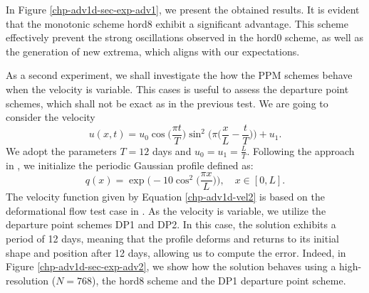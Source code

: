 In Figure \ref{chp-adv1d-sec-exp-adv1}, we present the obtained results.
It is evident that the monotonic scheme hord8 exhibit a significant advantage.
This scheme effectively prevent the strong oscillations observed in the hord0 scheme,
as well as the generation of new extrema, which aligns with our expectations.

As a second experiment, we shall investigate the how the PPM schemes behave when the velocity
is variable.
This cases is useful to assess the departure point schemes, which shall not be exact as in the previous test.
We are going to consider the velocity
\begin{equation}
	\label{chp-adv1d-vel2}
	u(x,t) = u_0\cos{\bigg(\frac{\pi t}{T}\bigg)}\sin^2\bigg(\pi \bigg(\frac{x}{L}-\frac{t}{T}\bigg)\bigg) + u_1.
\end{equation}
We adopt the parameters $T = 12$ days and  $u_0 = u_1 = \frac{L}{T}$.
Following the approach in \citet{trefethen:2000}, we initialize the periodic Gaussian profile defined as:
\begin{equation}
	\label{chp-adv1d-ic2}
	q(x) = \exp\bigg(-10\cos^2{\bigg(\frac{\pi x}{L}\bigg)}\bigg),\quad x \in [0,L].
\end{equation}
The velocity function given by Equation \eqref{chp-adv1d-vel2} is based
on the deformational flow test case in \citet{nair:2010}.
As the velocity is variable, we utilize the departure point schemes DP1 and DP2.
In this case, the solution exhibits a period of 12 days,
meaning that the profile deforms and returns to its initial shape
and position after 12 days, allowing us to compute the error.
Indeed, in Figure \ref{chp-adv1d-sec-exp-adv2}, we show how the solution behaves
using a high-resolution ($N=768$), the hord8 scheme and the DP1 departure point scheme.

